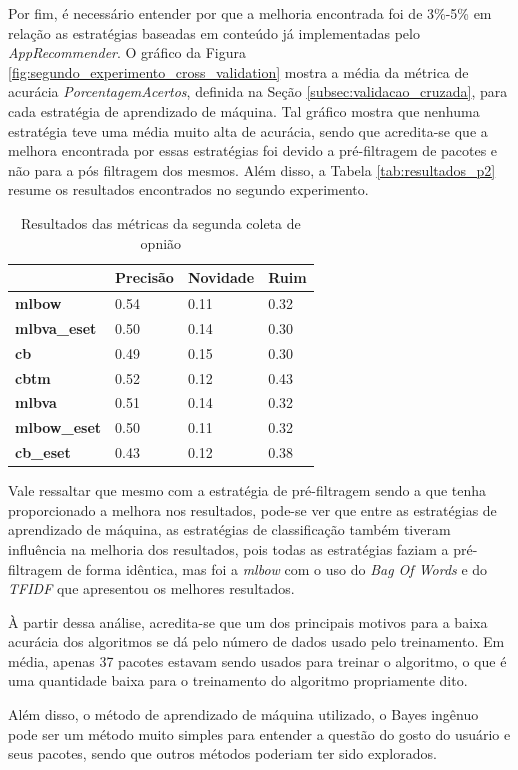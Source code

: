 Por fim, é necessário entender por que a melhoria encontrada foi de 3\%-5\% em
relação as estratégias baseadas em conteúdo já implementadas pelo
\textit{AppRecommender}. O gráfico da Figura \ref{fig:segundo_experimento_cross_validation}
mostra a média da métrica de acurácia \textit{PorcentagemAcertos}, definida na Seção
\ref{subsec:validacao_cruzada}, para cada estratégia de aprendizado de máquina.
Tal gráfico mostra que nenhuma estratégia teve uma média muito alta de acurácia,
sendo que acredita-se que a melhora encontrada por essas estratégias foi devido a
pré-filtragem de pacotes e não para a pós filtragem dos mesmos. Além disso, a
Tabela \ref{tab:resultados_p2} resume os resultados encontrados no segundo
experimento.

\begin{table}[]
    \centering
    \begin{tabular}{|l|l|l|l|}
        \hline
        & \textbf{Precisão} & \textbf{Novidade} & \textbf{Ruim} \\ \hline
        \textbf{mlbow}       & 0.54     & 0.11     & 0.32 \\ \hline
        \textbf{mlbva\_eset} & 0.50     & 0.14     & 0.30 \\ \hline
        \textbf{cb}          & 0.49     & 0.15     & 0.30 \\ \hline
        \textbf{cbtm}        & 0.52     & 0.12     & 0.43 \\ \hline
        \textbf{mlbva}       & 0.51     & 0.14     & 0.32 \\ \hline
        \textbf{mlbow\_eset} & 0.50     & 0.11     & 0.32 \\ \hline
        \textbf{cb\_eset}    & 0.43     & 0.12     & 0.38 \\ \hline
    \end{tabular}
    \caption{Resultados das métricas da segunda coleta de opnião}
    \label{tab:resultado_p2}
\end{table}

Vale ressaltar que mesmo com a estratégia de pré-filtragem sendo a que tenha
proporcionado a melhora nos resultados, pode-se ver que entre as estratégias de
aprendizado de máquina, as estratégias de classificação também tiveram influência
na melhoria dos resultados, pois todas as estratégias faziam a pré-filtragem de
forma idêntica, mas foi a \textit{mlbow} com o uso do \textit{Bag Of Words} e do
\textit{TFIDF} que apresentou os melhores resultados.

À partir dessa análise, acredita-se que um dos principais motivos para a baixa acurácia dos algoritmos
se dá pelo número de dados usado pelo treinamento. Em média, apenas 37 pacotes
estavam sendo usados para treinar o algoritmo, o que é uma
quantidade baixa para o treinamento do algoritmo propriamente dito.

Além disso, o método de aprendizado de máquina utilizado, o Bayes ingênuo pode
ser um método muito simples para entender a questão do gosto do usuário e seus
pacotes, sendo que outros métodos poderiam ter sido explorados.
